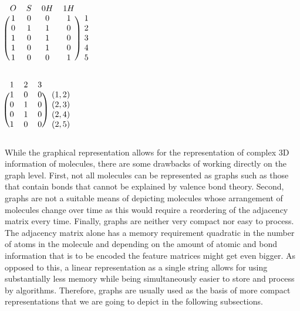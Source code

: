 \begin{minipage}{0.45\textwidth}
	\centering
	$
	\begin{blockarray}{ccccc}
	O & S & 0H & 1H  \\
	\begin{block}{(cccc)c}
	1 & 0 & 0 & 1 &  1 \\
	0 & 1 & 1 & 0 & 2 \\
	1 & 0 & 1 & 0 &  3 \\
	1 & 0 & 1 & 0 &  4 \\
	1 & 0 & 0 & 1 &  5 \\
	\end{block}
	\end{blockarray}
	$
	\label{fig:mol_node_feature_matrix}
\end{minipage}
\hfill
\begin{minipage}{0.45\textwidth}
	\vspace{.1cm}
	\centering
	$
	\begin{blockarray}{cccc}
	1 & 2 & 3  \\
	\begin{block}{(ccc)c}
	1 & 0 & 0 &  (1,2) \\
	0 & 1 & 0 &  (2,3) \\
	0 & 1 & 0 &  (2,4) \\
	1 & 0 & 0 &  (2,5) \\
	\end{block}
	\end{blockarray}
	$
	\label{fig:mol_edge_feature_matrix}
\end{minipage}
\newline\newline
While the graphical representation allows for the representation of complex 3D information of molecules, there are some drawbacks of working directly on the graph level. First, not all molecules can be represented as graphs \citep{molrep} such as those that contain bonds that cannot be explained by valence bond theory. Second, graphs are not a suitable means of depicting molecules whose arrangement of molecules change over time as this would require a reordering of the adjacency matrix every time. Finally, graphs are neither very compact nor easy to process. The adjacency matrix alone has a memory requirement quadratic in the number of atoms in the molecule and depending on the amount of atomic and bond information that is to be encoded the feature matrices might get even bigger. As opposed to this, a linear representation as a single string allows for using substantially less memory while being simultaneously easier to store and process by algorithms. Therefore, graphs are usually used as the basis of more compact representations that we are going to depict in the following subsections. 

